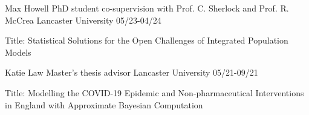 

\begin{cvhonors}

  \cvhonor
    {Max Howell} %
    {PhD student co-supervision with Prof. C. Sherlock and Prof. R. McCrea} %
    {Lancaster University} %
    {05/23-04/24} %

    \extracvhonor
    {Title: }
    {Statistical Solutions for the Open Challenges of Integrated Population Models}
    {}
    {}

\end{cvhonors}

\begin{cvhonors}

  \cvhonor
    {Katie Law} %
    {Master's thesis advisor} %
    {Lancaster University} %
    {05/21-09/21} %

    \extracvhonor
    {Title: }
    {Modelling the COVID-19 Epidemic and Non-pharmaceutical Interventions in England with Approximate Bayesian Computation}
    {}
    {}

\end{cvhonors}

